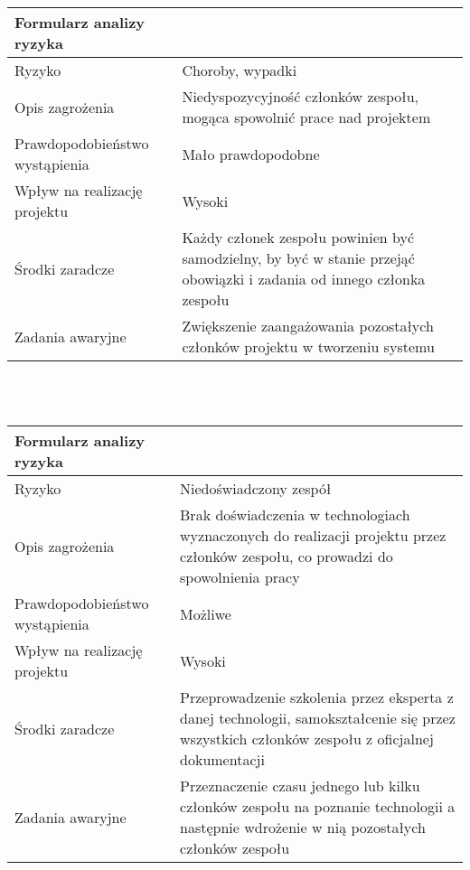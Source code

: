 \documentclass{article}
\begin{document}
\mbox{}\\\mbox{}\\

\begin{tabular}{|L{6cm}|L{9cm}|}
\hline
Formularz analizy ryzyka &  \\
\hline
Ryzyko 						   & Choroby, wypadki \\
\hline
Opis zagrożenia				   & Niedyspozycyjność członków zespołu, mogąca spowolnić prace nad projektem \\
\hline
Prawdopodobieństwo wystąpienia & Mało prawdopodobne \\
\hline
Wpływ na realizację projektu   & Wysoki \\
\hline
Środki zaradcze				   & Każdy członek zespołu powinien być samodzielny, by być w stanie przejąć obowiązki i zadania od innego członka zespołu \\
\hline
Zadania awaryjne			   & Zwiększenie zaangażowania pozostałych członków projektu w tworzeniu systemu \\
\hline
\end{tabular}

\mbox{}\\\mbox{}\\

\begin{tabular}{|L{6cm}|L{9cm}|}
\hline
Formularz analizy ryzyka &  \\
\hline
Ryzyko 						   & Niedoświadczony zespół \\
\hline
Opis zagrożenia				   & Brak doświadczenia w technologiach wyznaczonych do realizacji projektu przez członków zespołu, co prowadzi do spowolnienia pracy \\
\hline
Prawdopodobieństwo wystąpienia & Możliwe \\
\hline
Wpływ na realizację projektu   & Wysoki \\
\hline
Środki zaradcze				   & Przeprowadzenie szkolenia przez eksperta z danej technologii, samokształcenie się przez wszystkich członków zespołu z oficjalnej dokumentacji  \\
\hline
Zadania awaryjne			   & Przeznaczenie czasu jednego lub kilku członków zespołu na poznanie technologii a następnie wdrożenie w nią pozostałych członków zespołu \\
\hline
\end{tabular}

\mbox{}\\\mbox{}\\
\end{document}
